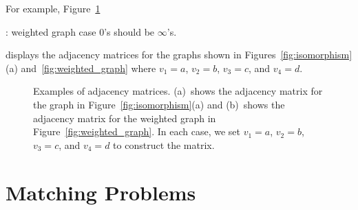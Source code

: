 For example, Figure~\ref{fig:adjacency_matrix}
\begin{editingnotes}
: weighted graph case 0's should be $\infty$'s.
\end{editingnotes}
displays the adjacency
matrices for the graphs shown in Figures~\ref{fig:isomorphism}(a)
and~\ref{fig:weighted_graph} where $v_1 = a$, $v_2 = b$, $v_3 = c$,
and $v_4 = d$.

\begin{figure}\redrawntrue
\normalbaselines
{}
\qquad
{}

\caption{Examples of adjacency matrices.  (a)~shows the adjacency
  matrix for the graph in Figure~\ref{fig:isomorphism}(a) and
  (b)~shows the adjacency matrix for the weighted graph in
  Figure~\ref{fig:weighted_graph}.  In each case, we  set $v_1
  = a$, $v_2 = b$, $v_3 = c$, and $v_4 = d$ to construct the matrix.}
\label{fig:adjacency_matrix}
\end{figure}

\begin{problems}
\classproblems
{}

\homeworkproblems
{}

\examproblems
{}
\end{problems}


\section{Matching Problems}\label{sexam}

